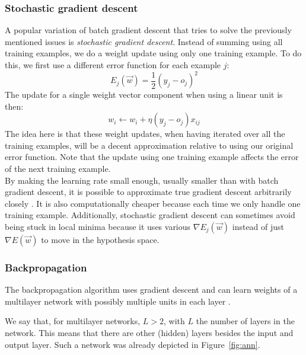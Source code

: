 \subsubsection{Stochastic gradient descent} %
\label{ssub:stochastic_gradient_descent}
A popular variation of batch gradient descent that tries to solve the previously mentioned issues is \textit{stochastic gradient descent}. Instead of summing using all training examples, we do a weight update using only one training example. To do this, we first use a different error function for each example $j$:
\begin{equation}
    E_j(\overrightarrow{w}) = \frac{1}{2}(y_j - o_j)^2
\end{equation}
The update for a single weight vector component when using a linear unit is then:
\begin{equation}
    w_i \gets w_i + \eta (y_j- o_j)x_{ij}
\end{equation}
The idea here is that these weight updates, when having iterated over all the training examples, will be a decent approximation relative to using our original error function. Note that the update using one training example affects the error of the next training example.\\

By making the learning rate small enough, usually smaller than with batch gradient descent, it is possible to approximate true gradient descent arbitrarily closely \citep{ML}.
It is also computationally cheaper because each time we only handle one training example.
Additionally, stochastic gradient descent can sometimes avoid being stuck in local minima because it uses various $\nabla E_j(\overrightarrow{w})$ instead of just $\nabla E(\overrightarrow{w})$ to move in the hypothesis space.

\subsubsection{Backpropagation} %
\label{ssub:backpropagation}
The backpropagation algorithm uses gradient descent and can learn weights of a multilayer network with possibly multiple units in each layer \citep{rumelhart1986learning}.

We say that, for multilayer networks, $L>2$, with $L$ the number of layers in the network. This means that there are other (hidden) layers besides the input and output layer. Such a network was already depicted in Figure~\ref{fig:ann}.

